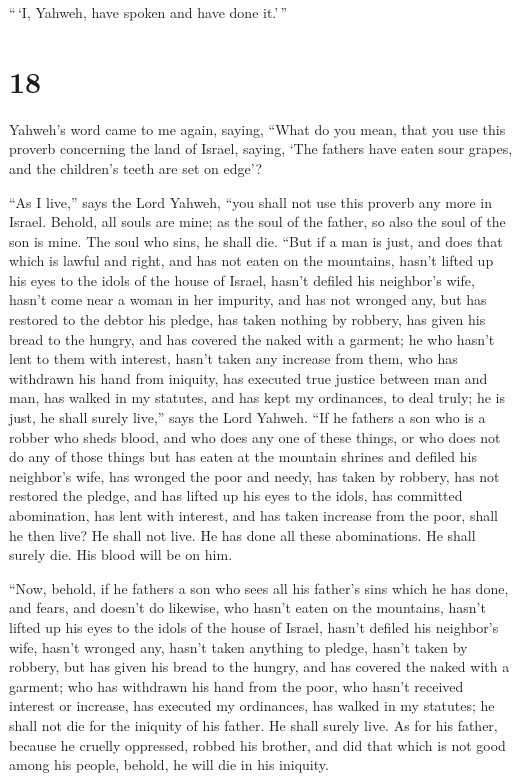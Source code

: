 ``\,`I, Yahweh, have spoken and have done it.'\,''

\hypertarget{section-16}{%
\section{18}\label{section-16}}

 Yahweh's word came to me again, saying, 
``What do you mean, that you use this proverb concerning the land of
Israel, saying, `The fathers have eaten sour grapes, and the children's
teeth are set on edge'?

 ``As I live,'' says the Lord Yahweh, ``you shall not use
this proverb any more in Israel.  Behold, all souls are
mine; as the soul of the father, so also the soul of the son is mine.
The soul who sins, he shall die.  ``But if a man is just,
and does that which is lawful and right,  and has not
eaten on the mountains, hasn't lifted up his eyes to the idols of the
house of Israel, hasn't defiled his neighbor's wife, hasn't come near a
woman in her impurity,  and has not wronged any, but has
restored to the debtor his pledge, has taken nothing by robbery, has
given his bread to the hungry, and has covered the naked with a garment;
 he who hasn't lent to them with interest, hasn't taken
any increase from them, who has withdrawn his hand from iniquity, has
executed true justice between man and man,  has walked in
my statutes, and has kept my ordinances, to deal truly; he is just, he
shall surely live,'' says the Lord Yahweh.  ``If he
fathers a son who is a robber who sheds blood, and who does any one of
these things,  or who does not do any of those things but
has eaten at the mountain shrines and defiled his neighbor's wife,
 has wronged the poor and needy, has taken by robbery,
has not restored the pledge, and has lifted up his eyes to the idols,
has committed abomination,  has lent with interest, and
has taken increase from the poor, shall he then live? He shall not live.
He has done all these abominations. He shall surely die. His blood will
be on him.

 ``Now, behold, if he fathers a son who sees all his
father's sins which he has done, and fears, and doesn't do likewise,
 who hasn't eaten on the mountains, hasn't lifted up his
eyes to the idols of the house of Israel, hasn't defiled his neighbor's
wife,  hasn't wronged any, hasn't taken anything to
pledge, hasn't taken by robbery, but has given his bread to the hungry,
and has covered the naked with a garment;  who has
withdrawn his hand from the poor, who hasn't received interest or
increase, has executed my ordinances, has walked in my statutes; he
shall not die for the iniquity of his father. He shall surely live.
 As for his father, because he cruelly oppressed, robbed
his brother, and did that which is not good among his people, behold, he
will die in his iniquity.

